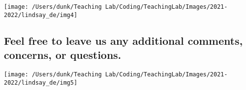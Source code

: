 \documentclass[10,a4paperpaper,]{article}
\begin{document}
\begin{center}\texttt{[image: /Users/dunk/Teaching Lab/Coding/TeachingLab/Images/2021-2022/lindsay\_de/img4]} \end{center}

\subsection{Feel free to leave us any additional comments, concerns, or questions.}

\begin{center}\texttt{[image: /Users/dunk/Teaching Lab/Coding/TeachingLab/Images/2021-2022/lindsay\_de/img5]} \end{center}
\end{document}
